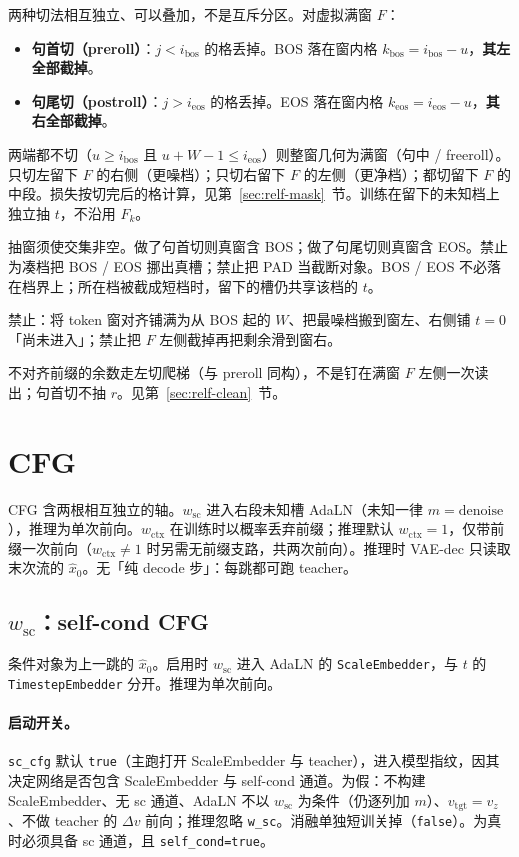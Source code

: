 \documentclass[UTF8,a4paper,11pt]{ctexart}
\begin{document}
两种切法相互独立、可以叠加，不是互斥分区。对虚拟满窗 \(F\)：
\begin{itemize}
  \item \textbf{句首切（preroll）}：\(j<i_{\mathrm{bos}}\) 的格丢掉。BOS 落在窗内格 \(k_{\mathrm{bos}}=i_{\mathrm{bos}}-u\)，\textbf{其左全部截掉}。
  \item \textbf{句尾切（postroll）}：\(j>i_{\mathrm{eos}}\) 的格丢掉。EOS 落在窗内格 \(k_{\mathrm{eos}}=i_{\mathrm{eos}}-u\)，\textbf{其右全部截掉}。
\end{itemize}
两端都不切（\(u\ge i_{\mathrm{bos}}\) 且 \(u+W-1\le i_{\mathrm{eos}}\)）则整窗几何为满窗（句中 / freeroll）。只切左留下 \(F\) 的右侧（更噪档）；只切右留下 \(F\) 的左侧（更净档）；都切留下 \(F\) 的中段。损失按切完后的格计算，见第~\ref{sec:relf-mask}~节。训练在留下的未知档上独立抽 \(t\)，不沿用 \(F_k\)。

抽窗须使交集非空。做了句首切则真窗含 BOS；做了句尾切则真窗含 EOS。禁止为凑档把 BOS / EOS 挪出真槽；禁止把 PAD 当截断对象。BOS / EOS 不必落在档界上；所在档被截成短档时，留下的槽仍共享该档的 \(t\)。

禁止：将 token 窗对齐铺满为从 BOS 起的 \(W\)、把最噪档搬到窗左、右侧铺 \(t=0\)「尚未进入」；禁止把 \(F\) 左侧截掉再把剩余滑到窗右。

不对齐前缀的余数走左切爬梯（与 preroll 同构），不是钉在满窗 \(F\) 左侧一次读出；句首切不抽 \(r\)。见第~\ref{sec:relf-clean}~节。

\section{CFG}
\label{sec:cfg}

CFG 含两根相互独立的轴。\(w_{\mathrm{sc}}\) 进入右段未知槽 AdaLN（未知一律 \(m=\mathrm{denoise}\)），推理为单次前向。\(w_{\mathrm{ctx}}\) 在训练时以概率丢弃前缀；推理默认 \(w_{\mathrm{ctx}}=1\)，仅带前缀一次前向（\(w_{\mathrm{ctx}}\neq 1\) 时另需无前缀支路，共两次前向）。推理时 VAE-dec 只读取末次流的 \(\hat x_0\)。无「纯 decode 步」：每跳都可跑 teacher。

\subsection{\texorpdfstring{\(w_{\mathrm{sc}}\)：self-cond CFG}{w_sc：self-cond CFG}}

条件对象为上一跳的 \(\hat x_0\)。启用时 \(w_{\mathrm{sc}}\) 进入 AdaLN 的 \texttt{ScaleEmbedder}，与 \(t\) 的 \texttt{TimestepEmbedder} 分开。推理为单次前向。

\paragraph{启动开关。}
\texttt{sc\_cfg} 默认 \texttt{true}（主跑打开 ScaleEmbedder 与 teacher），进入模型指纹，因其决定网络是否包含 ScaleEmbedder 与 self-cond 通道。为假：不构建 ScaleEmbedder、无 sc 通道、AdaLN 不以 \(w_{\mathrm{sc}}\) 为条件（仍逐列加 \(m\)）、\(v_{\mathrm{tgt}}=v_z\)、不做 teacher 的 \(\Delta v\) 前向；推理忽略 \texttt{w\_sc}。消融单独短训关掉（\texttt{false}）。为真时必须具备 sc 通道，且 \texttt{self\_cond=true}。
\end{document}
